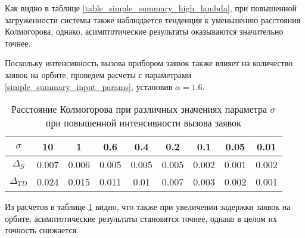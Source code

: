 Как видно в таблице \ref{table_simple_summary_high_lambda},  при повышенной загруженности системы также наблюдается тенденция к уменьшению расстояния Колмогорова, однако, асимптотические результаты оказываются значительно точнее.

Поскольку интенсивность вызова прибором заявок также влияет на количество заявок на орбите, проведем расчеты с параметрами \eqref{simple_summary_input_params}, установив $\alpha = 1.6$.

\begin{table}[h!] 
	\centering
	\caption{Расстояние Колмогорова при различных значениях параметра $\sigma$ при повышенной интенсивности вызова заявок}
	\label{table_simple_summary_high_alpha}
	\begin{tabular}{| c | c | c | c | c | c | c | c | c |}
		\hline
		$\sigma$ & 10 & 1 & 0.6 & 0.4 & 0.2 & 0.1 & 0.05 & 0.01 \\ 
		\hline
		$\Delta_S$ & 0.007 & 0.006 & 0.005 & 0.005 & 0.005 & 0.002 & 0.001 & 0.002\\
		\hline
		$\Delta_{TD}$ & 0.024 & 0.015 & 0.011 & 0.01 & 0.007 & 0.003 & 0.002 & 0.001\\
		\hline
	\end{tabular}
\end{table}

Из расчетов в таблице \ref{table_simple_summary_high_alpha} видно, что также при увеличении задержки заявок на орбите, асимптотические результаты становятся точнее, однако в целом их точность снижается.

